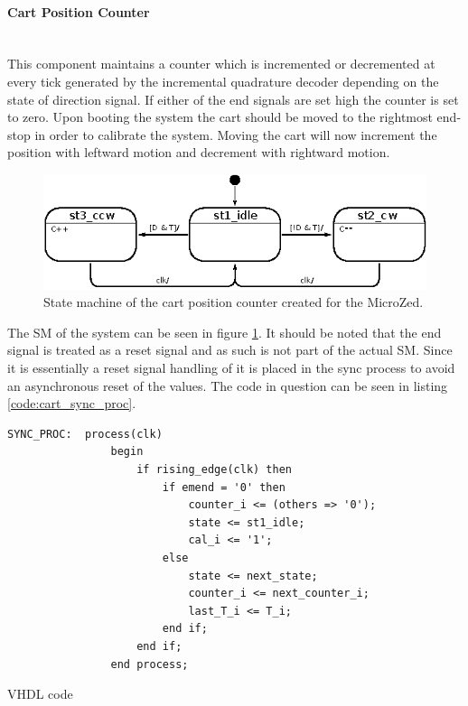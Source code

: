 \paragraph{Cart Position Counter}~\\ %
\label{par:cart_position_counter}
This component maintains a counter which is incremented or decremented at every tick generated by the incremental quadrature decoder depending on the state of direction signal.
If either of the end signals are set high the counter is set to zero.
Upon booting the system the cart should be moved to the rightmost end-stop in order to calibrate the system.
Moving the cart will now increment the position with leftward motion and decrement with rightward motion.

\begin{figure}[h]
	\centering
	\includegraphics[width=.75\linewidth]{graphics/count_state_machine}
	\caption{State machine of the cart position counter created for the MicroZed.}
	\label{fig:countstatemachine}
\end{figure}

The SM of the system can be seen in figure \ref{fig:countstatemachine}.
It should be noted that the end signal is treated as a reset signal and as such is not part of the actual SM.
Since it is essentially a reset signal handling of it is placed in the sync process to avoid an asynchronous reset of the values.
The code in question can be seen in listing \ref{code:cart_sync_proc}.

\begin{listing}[h]
\begin{verbatim}
SYNC_PROC:  process(clk)
		        begin
		            if rising_edge(clk) then
		                if emend = '0' then
		                    counter_i <= (others => '0');
		                    state <= st1_idle;
		                    cal_i <= '1';
		                else
		                    state <= next_state;
		                    counter_i <= next_counter_i;
		                    last_T_i <= T_i;
		                end if;
		            end if;
		        end process;
\end{verbatim}
\caption{VHDL code}
\label{code:cart_sync_proc}
\end{listing}

